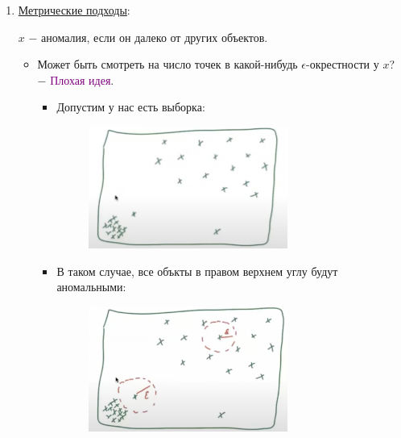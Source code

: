 \begin{enumerate}
\begin{enumerate}
                     \item \underline{Метрические подходы}:
                     \begin{center}
                     \colorbox{blue!20}{
                         $x$ $-$ аномалия, если он далеко от других объектов.}
                     \end{center}

                     \begin{itemize}
                         \item Может быть смотреть на число точек в какой-нибудь $\epsilon$-окрестности у $x$? $-$ \textcolor{purple}{Плохая идея}.
                         \begin{itemize}
                             \item Допустим у нас есть выборка:
                             \begin{figure}[H]
                                \centering
                                \includegraphics[width=0.7\textwidth]{images/18lecture/metric_method_1.png}
                            \end{figure}

                            \item В таком случае, все объкты в правом верхнем углу будут аномальными:
                            \begin{figure}[H]
                                \centering
                                \includegraphics[width=0.7\textwidth]{images/18lecture/metric_method_2.png}
                            \end{figure}


\end{itemize}
\end{itemize}
\end{enumerate}
\end{enumerate}
